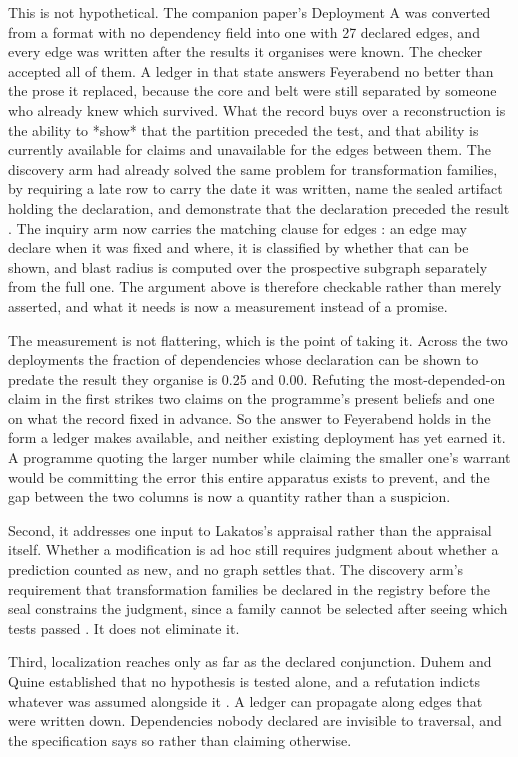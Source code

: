 \documentclass[11pt,letterpaper]{article}
\begin{document}
This is not hypothetical. The companion paper's Deployment A was converted from a
format with no dependency field into one with 27 declared edges, and every edge
was written after the results it organises were known. The checker accepted all
of them. A ledger in that state answers Feyerabend no better than the prose it
replaced, because the core and belt were still separated by someone who already
knew which survived. What the record buys over a reconstruction is the ability
to *show* that the partition preceded the test, and that ability is currently
available for claims and unavailable for the edges between them. The discovery
arm had already solved the same problem for transformation families, by
requiring a late row to carry the date it was written, name the sealed artifact
holding the declaration, and demonstrate that the declaration preceded the
result \citep{pedsc}. The inquiry arm now carries the matching clause for edges
\citep{pecls}: an edge may declare when it was fixed and where, it is classified
by whether that can be shown, and blast radius is computed over the prospective
subgraph separately from the full one. The argument above is therefore checkable
rather than merely asserted, and what it needs is now a measurement instead of a
promise.

The measurement is not flattering, which is the point of taking it. Across the
two deployments the fraction of dependencies whose declaration can be shown to
predate the result they organise is 0.25 and 0.00. Refuting the most-depended-on
claim in the first strikes two claims on the programme's present beliefs and one
on what the record fixed in advance. So the answer to Feyerabend holds in the
form a ledger makes available, and neither existing deployment has yet earned
it. A programme quoting the larger number while claiming the smaller one's
warrant would be committing the error this entire apparatus exists to prevent,
and the gap between the two columns is now a quantity rather than a suspicion.

Second, it addresses one input to Lakatos's appraisal rather than the appraisal
itself. Whether a modification is ad hoc still requires judgment about whether a
prediction counted as new, and no graph settles that. The discovery arm's
requirement that transformation families be declared in the registry before the
seal constrains the judgment, since a family cannot be selected after seeing
which tests passed \citep{pedsc}. It does not eliminate it.

Third, localization reaches only as far as the declared conjunction. Duhem and
Quine established that no hypothesis is tested alone, and a refutation indicts
whatever was assumed alongside it \citep{duhem1954,quine1951}. A ledger can
propagate along edges that were written down. Dependencies nobody declared are
invisible to traversal, and the specification says so rather than claiming
otherwise.
\end{document}
